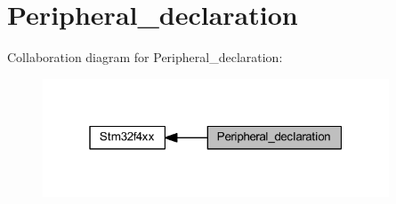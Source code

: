 \hypertarget{group___peripheral__declaration}{}\section{Peripheral\+\_\+declaration}
\label{group___peripheral__declaration}
Collaboration diagram for Peripheral\+\_\+declaration\+:\nopagebreak
\begin{figure}[H]
\begin{center}
\leavevmode
\includegraphics[width=292pt]{group___peripheral__declaration}
\end{center}
\end{figure}
